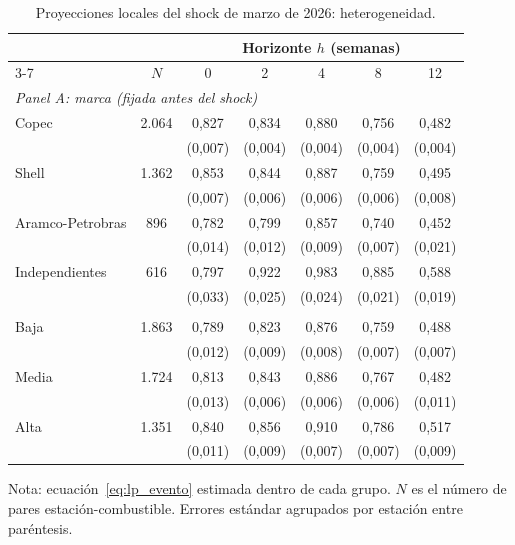 \documentclass[11pt]{article}
\begin{document}
\begin{table}[htbp]
\centering
\caption{Proyecciones locales del shock de marzo de 2026: heterogeneidad.}
\label{tab:lp_evento_het}
\begin{tabular}{lcccccc}
\toprule
 & & \multicolumn{5}{c}{Horizonte $h$ (semanas)} \\
\cmidrule(lr){3-7}
 & $N$ & 0 & 2 & 4 & 8 & 12 \\
\midrule
\multicolumn{7}{l}{\emph{Panel A: marca (fijada antes del shock)}} \\
Copec             & 2.064 & 0,827 & 0,834 & 0,880 & 0,756 & 0,482 \\
                  &       & (0,007) & (0,004) & (0,004) & (0,004) & (0,004) \\
Shell             & 1.362 & 0,853 & 0,844 & 0,887 & 0,759 & 0,495 \\
                  &       & (0,007) & (0,006) & (0,006) & (0,006) & (0,008) \\
Aramco-Petrobras  & 896   & 0,782 & 0,799 & 0,857 & 0,740 & 0,452 \\
                  &       & (0,014) & (0,012) & (0,009) & (0,007) & (0,021) \\
Independientes    & 616   & 0,797 & 0,922 & 0,983 & 0,885 & 0,588 \\
                  &       & (0,033) & (0,025) & (0,024) & (0,021) & (0,019) \\
\addlinespace
\multicolumn{7}{l}{\emph{Panel B: competidores a 2 km (terciles)}} \\
Baja              & 1.863 & 0,789 & 0,823 & 0,876 & 0,759 & 0,488 \\
                  &       & (0,012) & (0,009) & (0,008) & (0,007) & (0,007) \\
Media             & 1.724 & 0,813 & 0,843 & 0,886 & 0,767 & 0,482 \\
                  &       & (0,013) & (0,006) & (0,006) & (0,006) & (0,011) \\
Alta              & 1.351 & 0,840 & 0,856 & 0,910 & 0,786 & 0,517 \\
                  &       & (0,011) & (0,009) & (0,007) & (0,007) & (0,009) \\
\bottomrule
\end{tabular}

\medskip
\begin{minipage}{0.92\textwidth}
\footnotesize
Nota: ecuación~\eqref{eq:lp_evento} estimada dentro de cada grupo. $N$ es el
número de pares estación-combustible. Errores estándar agrupados por
estación entre paréntesis.
\end{minipage}
\end{table}
\end{document}
